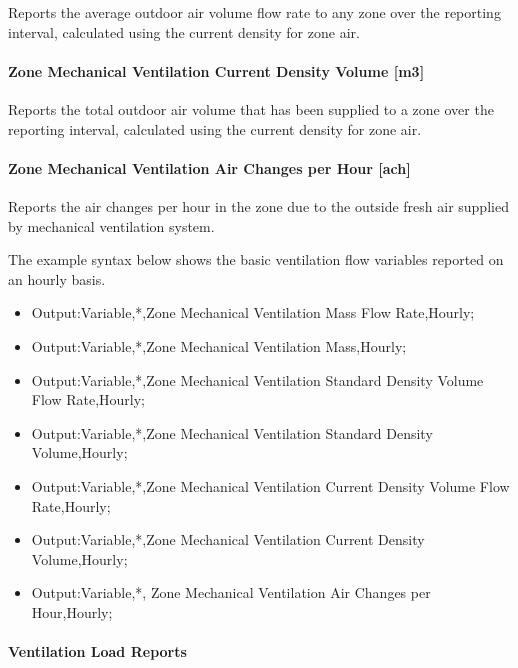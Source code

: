 Reports the average outdoor air volume flow rate to any zone over the reporting interval, calculated using the current density for zone air.

\paragraph{Zone Mechanical Ventilation Current Density Volume {[}m3{]}}\label{zone-mechanical-ventilation-current-density-volume-m3}

Reports the total outdoor air volume that has been supplied to a zone over the reporting interval, calculated using the current density for zone air.

\paragraph{Zone Mechanical Ventilation Air Changes per Hour {[}ach{]}}\label{zone-mechanical-ventilation-air-changes-per-hour-ach}

Reports the air changes per hour in the zone due to the outside fresh air supplied by mechanical ventilation system.

The example syntax below shows the basic ventilation flow variables reported on an hourly basis.

\begin{itemize}
\item
  Output:Variable,*,Zone Mechanical Ventilation Mass Flow Rate,Hourly;
\item
  Output:Variable,*,Zone Mechanical Ventilation Mass,Hourly;
\item
  Output:Variable,*,Zone Mechanical Ventilation Standard Density Volume Flow Rate,Hourly;
\item
  Output:Variable,*,Zone Mechanical Ventilation Standard Density Volume,Hourly;
\item
  Output:Variable,*,Zone Mechanical Ventilation Current Density Volume Flow Rate,Hourly;
\item
  Output:Variable,*,Zone Mechanical Ventilation Current Density Volume,Hourly;
\item
  Output:Variable,*, Zone Mechanical Ventilation Air Changes per Hour,Hourly;
\end{itemize}

\paragraph{Ventilation Load Reports}\label{ventilation-load-reports}

